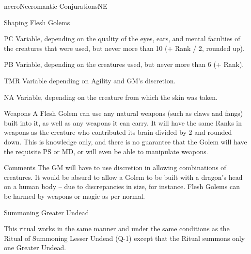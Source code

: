 \begin{college}[1.1]{necro}{Necromantic Conjurations}{NE}
\begin{ritual}[R-4]{Shaping Flesh Golems}
\begin{effects}
\begin{Description}
\item[PC]
Variable, depending on the quality of the eyes, ears, and mental
faculties of the creatures that were used, but never more than 10 (+
Rank / 2, rounded up).

\item[PB]
Variable, depending on the creatures used, but never more than 6 (+
Rank).

\item[TMR]
Variable depending on Agility and GM's discretion.

\item[NA]
Variable, depending on the creature from which the skin was taken.

\item[Weapons]
A Flesh Golem can use any natural weapons (such as claws and fangs)
built into it, as well as any weapons it can carry.  It will have the
same Ranks in weapons as the creature who contributed its brain
divided by 2 and rounded down.  This is knowledge only, and there is
no guarantee that the Golem will have the requisite PS or MD, or will
even be able to manipulate weapons.

\item[Comments]
The GM will have to use discretion in allowing combinations of
creatures. It would be absurd to allow a Golem to be built with a
dragon's head on a human body -- due to discrepancies in size, for
instance.  Flesh Golems can be harmed by weapons or magic as per
normal.
\end{Description}
\end{effects}
\end{ritual}

\begin{ritual}[R-5]{Summoning Greater Undead}

\begin{effects}
This ritual works in the same manner and under the same conditions as
the Ritual of Summoning Lesser Undead (Q-1) except that the Ritual
summons only one Greater Undead.
\end{effects}
\end{ritual}
\end{college}
